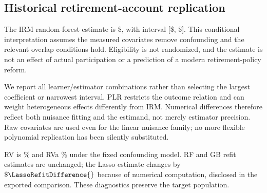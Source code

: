 \subsection{Historical retirement-account replication}

The IRM random-forest estimate is \$\PensionPoint{}, with interval [\$\PensionLow{}, \$\PensionHigh{}]. This conditional interpretation assumes the measured covariates remove confounding and the relevant overlap conditions hold. Eligibility is not randomized, and the estimate is not an effect of actual participation or a prediction of a modern retirement-policy reform.

We report all learner/estimator combinations rather than selecting the largest coefficient or narrowest interval. PLR restricts the outcome relation and can weight heterogeneous effects differently from IRM. Numerical differences therefore reflect both nuisance fitting and the estimand, not merely estimator precision. Raw covariates are used even for the linear nuisance family; no more flexible polynomial replication has been silently substituted.


RV is \SensitivityRV{}\% and RVa \SensitivityRVa{}\% under the fixed confounding model. RF and GB refit estimates are unchanged; the Lasso estimate changes by $\$\LassoRefitDifference{}$ because of numerical computation, disclosed in the exported comparison. These diagnostics preserve the target population.

